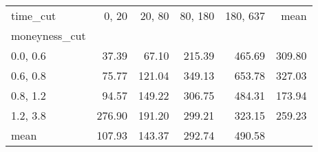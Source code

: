 \begin{tabular}{lrrrrr}
\toprule
time\_cut &  0, 20 &  20, 80 &  80, 180 &  180, 637 &   mean \\
moneyness\_cut &          &           &            &             &        \\
\midrule
0.0, 0.6    &    37.39 &     67.10 &     215.39 &      465.69 & 309.80 \\
0.6, 0.8    &    75.77 &    121.04 &     349.13 &      653.78 & 327.03 \\
0.8, 1.2    &    94.57 &    149.22 &     306.75 &      484.31 & 173.94 \\
1.2, 3.8    &   276.90 &    191.20 &     299.21 &      323.15 & 259.23 \\
mean          &   107.93 &    143.37 &     292.74 &      490.58 &        \\
\bottomrule
\end{tabular}
